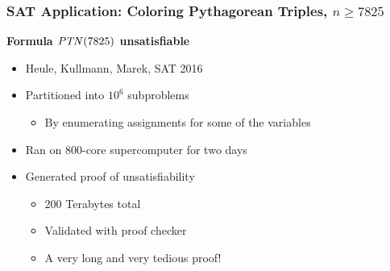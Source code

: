 \documentclass[t,pdf]{beamer}
\begin{document}
\begin{frame}
\frametitle{SAT Application: Coloring Pythagorean Triples, $n\geq 7825$}

{\bf Formula ${\it PTN}(7825)$ unsatisfiable}
\begin{itemize}
\item Heule, Kullmann, Marek, SAT 2016

\medskip

\item Partitioned into $10^6$ subproblems
  \begin{itemize}
    \item By enumerating assignments for some of the variables
  \end{itemize}

\medskip

  
\item Ran on 800-core supercomputer for two days

\medskip

\item Generated proof of unsatisfiability
  \begin{itemize}
  \item 200 Terabytes total
  \item Validated with proof checker
  \item A very long and very tedious proof!
  \end{itemize}
\end{itemize}

\end{frame}
\end{document}
